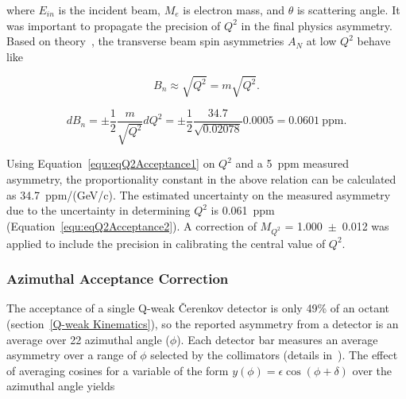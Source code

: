 \noindent 
where $E_{in}$ is the incident beam, $M_{e}$ is electron mass, and $\theta$ is scattering angle. 
It was important to propagate the precision of $Q^{2}$ in the final physics asymmetry. Based on theory~\cite{Afanasev200448}, the transverse beam spin asymmetries $A_{N}$ at low $Q^{2}$ behave like

\begin{equation} \label{equ:eqQ2Acceptance1}
B_{n} \approx \sqrt{Q^{2}} = m\sqrt{Q^{2}}.
\end{equation}

\begin{equation} \label{equ:eqQ2Acceptance2}
dB_{n} = \pm \frac{1}{2} \frac{m}{\sqrt{Q^{2}}} dQ^{2}
= \pm \frac{1}{2} \frac{34.7}{\sqrt{0.02078}} 0.0005
=  0.0601~\text{ppm}.
\end{equation}

Using Equation~\ref{equ:eqQ2Acceptance1} on $Q^{2}$ and a 5~ppm measured asymmetry, the proportionality constant in the above relation can be calculated as 34.7~ppm/(GeV/c). The estimated uncertainty on the measured asymmetry due to the uncertainty in determining $Q^{2}$ is 0.061~ppm (Equation~\ref{equ:eqQ2Acceptance2}). 
A correction of $M_{Q^{2}}$ = 1.000~$\pm$~0.012 was applied to include the precision in calibrating the central value of $Q^{2}$.




\subsubsection{Azimuthal Acceptance Correction}
\label{Azimuthal Acceptance Correction}

The acceptance of a single Q-weak \v{C}erenkov detector is only 49\% of an octant (section~\ref{Q-weak Kinematics}), so the reported asymmetry from a detector is an average over 22\degrees{} azimuthal angle ($\phi$). Each detector bar measures an average asymmetry over a range of $\phi$ selected by the collimators (details in~\cite{buddhini_qweak, elog:birchall_analysis373}). The effect of averaging cosines for a variable of the form $y(\phi) = \epsilon\cos(\phi + \delta)$ over the azimuthal angle yields 

